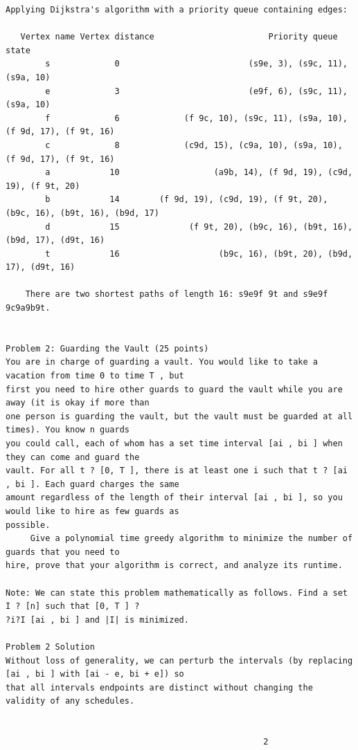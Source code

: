 \documentclass[12pt]{article}
\begin{document}
\begin{Verbatim}[breaklines=true,fontsize=\small]
    Applying Dijkstra's algorithm with a priority queue containing edges:

   Vertex name Vertex distance                       Priority queue state
        s             0                          (s9e, 3), (s9c, 11), (s9a, 10)
        e             3                          (e9f, 6), (s9c, 11), (s9a, 10)
        f             6             (f 9c, 10), (s9c, 11), (s9a, 10), (f 9d, 17), (f 9t, 16)
        c             8             (c9d, 15), (c9a, 10), (s9a, 10), (f 9d, 17), (f 9t, 16)
        a            10                   (a9b, 14), (f 9d, 19), (c9d, 19), (f 9t, 20)
        b            14        (f 9d, 19), (c9d, 19), (f 9t, 20), (b9c, 16), (b9t, 16), (b9d, 17)
        d            15              (f 9t, 20), (b9c, 16), (b9t, 16), (b9d, 17), (d9t, 16)
        t            16                    (b9c, 16), (b9t, 20), (b9d, 17), (d9t, 16)

    There are two shortest paths of length 16: s9e9f 9t and s9e9f 9c9a9b9t.


Problem 2: Guarding the Vault (25 points)
You are in charge of guarding a vault. You would like to take a vacation from time 0 to time T , but
first you need to hire other guards to guard the vault while you are away (it is okay if more than
one person is guarding the vault, but the vault must be guarded at all times). You know n guards
you could call, each of whom has a set time interval [ai , bi ] when they can come and guard the
vault. For all t ? [0, T ], there is at least one i such that t ? [ai , bi ]. Each guard charges the same
amount regardless of the length of their interval [ai , bi ], so you would like to hire as few guards as
possible.
     Give a polynomial time greedy algorithm to minimize the number of guards that you need to
hire, prove that your algorithm is correct, and analyze its runtime.

Note: We can state this problem mathematically as follows. Find a set I ? [n] such that [0, T ] ?
?i?I [ai , bi ] and |I| is minimized.

Problem 2 Solution
Without loss of generality, we can perturb the intervals (by replacing [ai , bi ] with [ai - e, bi + e]) so
that all intervals endpoints are distinct without changing the validity of any schedules.


                                                    2


\end{Verbatim}
\end{document}
